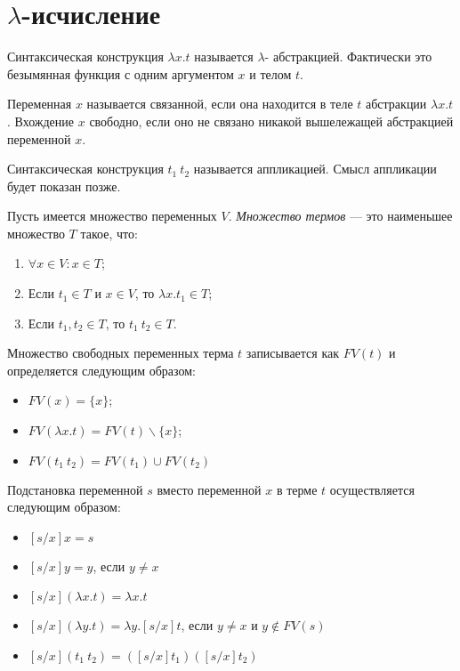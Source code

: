 \section{$\lambda$-исчисление}

\begin{definition}
    Синтаксическая конструкция $\lambda x. t$ называется $\lambda$- абстракцией. Фактически это безымянная функция с одним аргументом $x$ и телом $t$.
\end{definition}

\begin{definition}
    Переменная $x$ называется связанной, если она находится в теле $t$ абстракции $\lambda x.t$. Вхождение $x$ свободно, если оно не связано никакой вышележащей абстракцией переменной $x$.
\end{definition}

\begin{definition}
    Синтаксическая конструкция $t_1\ t_2$ называется аппликацией. Смысл аппликации будет показан позже.
\end{definition}

\begin{definition}
    Пусть имеется множество переменных $V$. \textit{Множество термов} --- это наименьшее множество $T$ такое, что:
    \begin{enumerate}
        \item $\forall x \in V: x \in T$;
        \item Если $t_1 \in T$ и $x \in V$, то $\lambda x.t_1 \in T$;
        \item Если $t_1, t_2 \in T$, то $t_1\ t_2 \in T$.
    \end{enumerate}
\end{definition}

\begin{definition}
    Множество свободных переменных терма $t$ записывается как $FV(t)$ и определяется следующим образом:
    \begin{itemize}
        \item $FV(x) = \{x\}$;
        \item $FV(\lambda x. t) = FV(t) \backslash \{x\}$;
        \item $FV(t_1\ t_2) = FV(t_1) \cup FV(t_2)$
    \end{itemize}
\end{definition}

\begin{definition}
    Подстановка переменной $s$ вместо переменной $x$ в терме $t$ осуществляется следующим образом:
    \begin{itemize}
        \item $[s/x]x = s$
        \item $[s/x]y = y$, если $y \neq x$
        \item $[s/x](\lambda x.t) = \lambda x.t$
        \item $[s/x](\lambda y. t) = \lambda y.[s/x]t$, если $y \neq x$ и $y \notin FV(s)$
        \item $[s/x](t_1\ t_2)= ([s/x]t_1)([s/x]t_2)$
    \end{itemize}
\end{definition}

